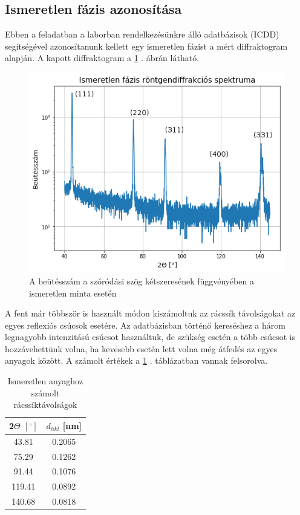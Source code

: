 \documentclass[12pt,a4paper]{article}
\begin{document}
\subsection{Ismeretlen fázis azonosítása}
\hspace*{10pt} Ebben a feladatban a laborban rendelkezésünkre álló adatbázisok (ICDD) segítségével azonosítanunk kellett egy ismeretlen fázist a mért diffraktogram alapján. A kapott diffraktogram a \ref{fig:5} . ábrán látható.\\
\begin{figure}[!h]
\centering
\includegraphics[scale=0.75]{ism_ind}
\caption{A beütésszám a szóródási szög kétszeresének függvényében a ismeretlen minta esetén}
\label{fig:5}
\end{figure}
\newline
A fent már többször is használt módon kiszámoltuk az rácssík távolságokat az egyes reflexiós csúcsok esetére. Az adatbázisban történő kereséshez a három legnagyobb intenzitású csúcsot használtuk, de szükség esetén a több csúcsot is hozzávehettünk volna, ha kevesebb esetén lett volna még átfedés az egyes anyagok között. A számolt értékek a \ref{tab:3} . táblázatban vannak felsorolva.
\begin{table}[!h]
\begin{center}
\begin{tabular}{|c|c|}
\hline
2$\Theta$ $[^{\circ}]$ & $d_{hkl}$ [nm] \\
\hline
43.81 & 0.2065 \\
\hline
75.29 & 0.1262 \\
\hline
91.44 & 0.1076 \\
\hline
119.41 & 0.0892 \\
\hline
140.68 & 0.0818 \\
\hline
\end{tabular}
\caption{Ismeretlen anyaghoz számolt rácssíktávolságok}
\label{tab:3}
\end{center}
\end{table}
\end{document}
